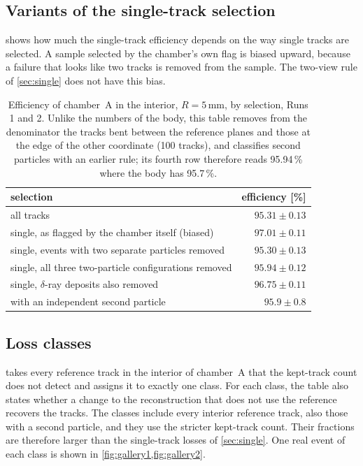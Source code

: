 \subsection{Variants of the single-track selection}
 shows how much the single-track efficiency depends on the way single tracks are selected. A sample
selected by the chamber's own flag is biased upward, because a failure that looks like two tracks is removed from the
sample. The two-view rule of \cref{sec:single} does not have this bias.
\begin{table}[tbp]
  \centering\small
  \caption{Efficiency of chamber~A in the interior, $R=5$\,mm, by selection, Runs 1 and 2. Unlike the numbers of the
  body, this table removes from the denominator the tracks bent between the reference planes and those at the edge of
  the other coordinate (100 tracks), and classifies second particles with an earlier rule; its fourth row therefore
  reads 95.94\,\% where the body has 95.7\,\%.}
  \label{tab:single}
  \begin{tabular}{lr}
    \hline
    selection & efficiency [\%] \\
    \hline
    all tracks & $95.31\pm0.13$ \\
    single, as flagged by the chamber itself (biased) & $97.01\pm0.11$ \\
    single, events with two separate particles removed & $95.30\pm0.13$ \\
    single, all three two-particle configurations removed & $95.94\pm0.12$ \\
    single, $\delta$-ray deposits also removed & $96.75\pm0.11$ \\
    with an independent second particle & $95.9\pm0.8$ \\
    \hline
  \end{tabular}
\end{table}

\subsection{Loss classes}\label{app:losses}
 takes every reference track in the interior of chamber~A that the kept-track count does not detect
and assigns it to exactly one class. For each class, the table also states whether a change to the reconstruction that
does not use the reference recovers the tracks. The classes include every interior reference track, also those with a
second particle, and they use the stricter kept-track count. Their fractions are therefore larger than the
single-track losses of \cref{sec:single}. One real event of each class is shown in \cref{fig:gallery1,fig:gallery2}.

